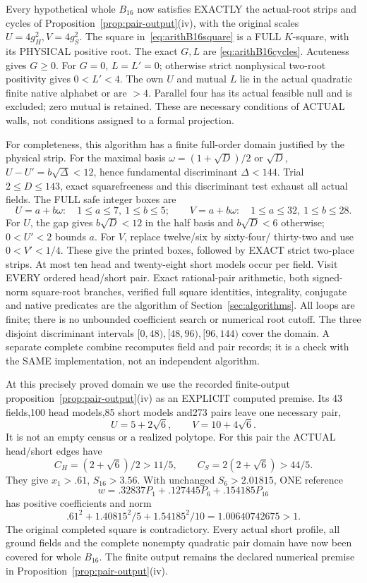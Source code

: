 \documentclass[11pt]{article}
\begin{document}
Every hypothetical whole \(B_{16}\) now satisfies
EXACTLY the actual-root strips and cycles of
Proposition~\ref{prop:pair-output}(iv), with the
original scales \(U=4g_H^2,V=4g_S^2\).
The square in~\eqref{eq:arithB16square} is a FULL
\(K\)-square, with its PHYSICAL positive root.
The exact \(G,L\) are
\eqref{eq:arithB16cycles}.
Acuteness gives \(G\ge0\).
For \(G=0\), \(L=L'=0\); otherwise strict
nonphysical two-root positivity gives \(0<L'<4\).
The own \(U\) and mutual \(L\) lie in the actual
quadratic finite native alphabet or are \(>4\).
Parallel four has its actual feasible null and
is excluded; zero mutual is retained.
These are necessary conditions of ACTUAL walls,
not conditions assigned to a formal projection.

For completeness, this algorithm has a finite
full-order domain justified by the physical strip.
For the maximal basis
\(\omega=(1+\sqrt D)/2\) or \(\sqrt D\),
\(U-U'=b\sqrt\Delta<12\), hence
fundamental discriminant \(\Delta<144\).
Trial \(2\le D\le143\), exact squarefreeness and
this discriminant test exhaust all actual fields.
The FULL safe integer boxes are
\[
 U=a+b\omega:\quad1\le a\le7,\ 1\le b\le5;\qquad
 V=a+b\omega:\quad1\le a\le32,\ 1\le b\le28 .
\]
For \(U\), the gap gives \(b\sqrt D<12\)
in the half basis and \(b\sqrt D<6\) otherwise;
\(0<U'<2\) bounds \(a\).
For \(V\), replace twelve/six by sixty-four/
thirty-two and use \(0<V'<1/4\).
These give the printed boxes, followed by EXACT
strict two-place strips.
At most ten head and twenty-eight short models
occur per field.
Visit EVERY ordered head/short pair.
Exact rational-pair arithmetic, both signed-norm
square-root branches, verified full square identities,
integrality, conjugate and native predicates are
the algorithm of Section~\ref{sec:algorithms}.
All loops are finite; there is no unbounded
coefficient search or numerical root cutoff.
The three disjoint discriminant intervals
\([0,48),[48,96),[96,144)\) cover the domain.
A separate complete combine recomputes field and
pair records; it is a check with the SAME
implementation, not an independent algorithm.

At this precisely proved domain we use the recorded
finite-output proposition~\ref{prop:pair-output}(iv)
as an EXPLICIT computed premise.
Its 43 fields,100 head models,85 short models
and273 pairs leave one necessary pair,
\[
                  U=5+2\sqrt6,\qquad V=10+4\sqrt6 .
\]
It is not an empty census or a realized polytope.
For this pair the ACTUAL head/short edges have
\[
 C_H=(2+\sqrt6)/2>11/5,\qquad
 C_S=2(2+\sqrt6)>44/5.
\]
They give \(x_1>.61\), \(S_{16}>3.56\).
With unchanged \(S_6>2.01815\), ONE reference
\[
                  w=.32837P_1+.127445P_6+.154185P_{16}
\]
has positive coefficients and norm
\[
                  .61^2+1.40815^2/5+1.54185^2/10
                              =1.00640742675>1 .
\]
The original completed square is contradictory.
Every actual short profile, all ground fields and
the complete nonempty quadratic pair domain have
now been covered for whole \(B_{16}\).
The finite output remains the declared numerical premise in
Proposition~\ref{prop:pair-output}(iv).
\end{document}
